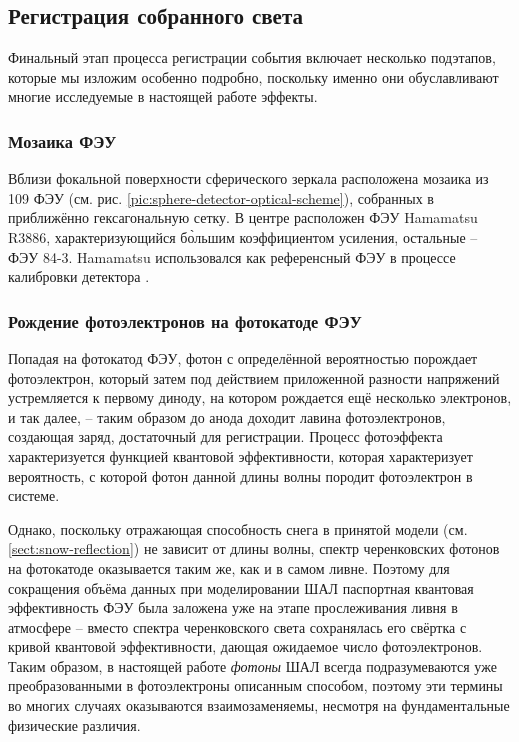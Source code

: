 \subsection{Регистрация собранного света}

Финальный этап процесса регистрации события включает несколько подэтапов, которые мы изложим особенно подробно, поскольку именно они обуславливают многие исследуемые в настоящей работе эффекты.

\subsubsection{Мозаика ФЭУ}
\label{sec:pmt-mosaic-details}

Вблизи фокальной поверхности сферического зеркала расположена мозаика из 109 ФЭУ (см. рис. \ref{pic:sphere-detector-optical-scheme}), собранных в приближённо гексагональную сетку. В центре расположен ФЭУ Hamamatsu R3886, характеризующийся б\`{о}льшим коэффициентом усиления, остальные -- ФЭУ 84-3. Hamamatsu использовался как референсный ФЭУ в процессе калибровки детектора \cite{SphereCalibration2016}.

\subsubsection{Рождение фотоэлектронов на фотокатоде ФЭУ}

Попадая на фотокатод ФЭУ, фотон с определённой вероятностью порождает фотоэлектрон, который затем под действием приложенной разности напряжений устремляется к первому диноду, на котором рождается ещё несколько электронов, и так далее, -- таким образом до анода доходит лавина фотоэлектронов, создающая заряд, достаточный для регистрации. Процесс фотоэффекта характеризуется функцией квантовой эффективности, которая характеризует вероятность, с которой фотон данной длины волны породит фотоэлектрон в системе.

Однако, поскольку отражающая способность снега в принятой модели (см. \ref{sect:snow-reflection}) не зависит от длины волны, спектр черенковских фотонов на фотокатоде оказывается таким же, как и в самом ливне. Поэтому для сокращения объёма данных при моделировании ШАЛ паспортная квантовая эффективность ФЭУ была заложена уже на этапе прослеживания ливня в атмосфере -- вместо спектра черенковского света сохранялась его свёртка с кривой квантовой эффективности, дающая ожидаемое число фотоэлектронов. Таким образом, в настоящей работе \textit{фотоны} ШАЛ всегда подразумеваются уже преобразованными в фотоэлектроны описанным способом, поэтому эти термины во многих случаях оказываются взаимозаменяемы, несмотря на фундаментальные физические различия.

